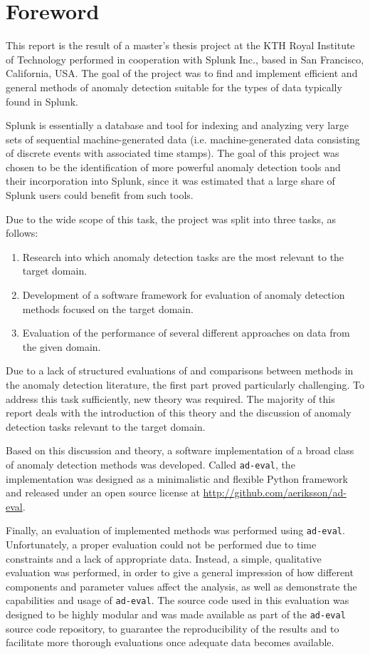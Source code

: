 \chapter*{Foreword}

This report is the result of a master's thesis project at the KTH Royal Institute of Technology performed in cooperation with Splunk Inc., based in San Francisco, California, USA. The goal of the project was to find and implement efficient and general methods of anomaly detection suitable for the types of data typically found in Splunk.

Splunk is essentially a database and tool for indexing and analyzing very large sets of sequential machine-generated data (i.e. machine-generated data consisting of discrete events with associated time stamps). The goal of this project was chosen to be the identification of more powerful anomaly detection tools and their incorporation into Splunk, since it was estimated that a large share of Splunk users could benefit from such tools.

Due to the wide scope of this task, the project was split into three tasks, as follows:
\begin{enumerate}
    \item Research into which anomaly detection tasks are the most relevant to the target domain.
    \item Development of a software framework for evaluation of anomaly detection methods focused on the target domain.
    \item Evaluation of the performance of several different approaches on data from the given domain.
\end{enumerate}

Due to a lack of structured evaluations of and comparisons between methods in the anomaly detection literature, the first part proved particularly challenging. To address this task sufficiently, new theory was required. The majority of this report deals with the introduction of this theory and the discussion of anomaly detection tasks relevant to the target domain.

Based on this discussion and theory, a software implementation of a broad class of anomaly detection methods was developed. Called \texttt{ad-eval}, the implementation was designed as a minimalistic and flexible Python framework and released under an open source license at \url{http://github.com/aeriksson/ad-eval}.

Finally, an evaluation of implemented methods was performed using \texttt{ad-eval}. Unfortunately, a proper evaluation could not be performed due to time constraints and a lack of appropriate data. Instead, a simple, qualitative evaluation was performed, in order to give a general impression of how different components and parameter values affect the analysis, as well as demonstrate the capabilities and usage of \texttt{ad-eval}. The source code used in this evaluation was designed to be highly modular and was made available as part of the \texttt{ad-eval} source code repository, to guarantee the reproducibility of the results and to facilitate more thorough evaluations once adequate data becomes available.
